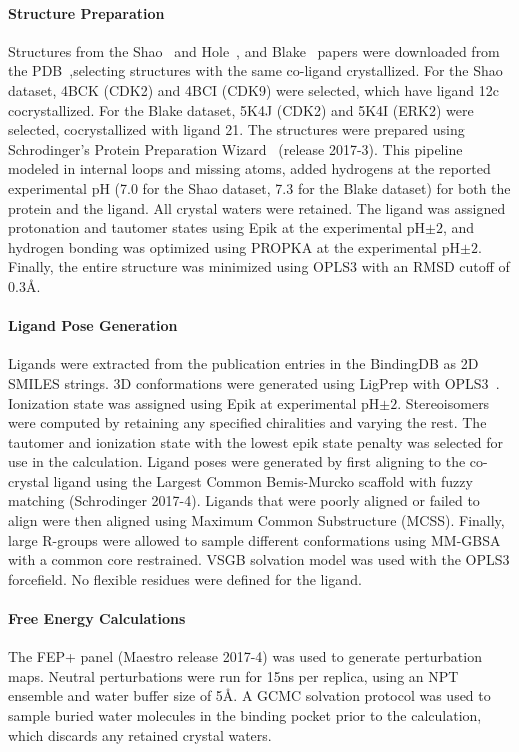 \documentclass[9pt,lineno]{elife-modified} %
\begin{document}
\paragraph{Structure Preparation}
Structures from the Shao~\citep{Shao2013-oe} and Hole~\citep{Hole2013-sr}, and Blake~\citep{Blake2016-su} papers were downloaded from the PDB~\citep{Berman2002-hg},selecting structures with the same co-ligand crystallized. For the Shao dataset, 4BCK (CDK2) and 4BCI (CDK9) were selected, which have ligand 12c cocrystallized. For the Blake dataset, 5K4J (CDK2) and 5K4I (ERK2) were selected, cocrystallized with ligand 21. The structures were prepared using Schrodinger’s Protein Preparation Wizard~\citep{Sastry2013-ax} (release 2017-3). This pipeline modeled in internal loops and missing atoms, added hydrogens at the reported experimental pH (7.0 for the Shao dataset, 7.3 for the Blake dataset) for both the protein and the ligand. All crystal waters were retained. The ligand was assigned protonation and tautomer states using Epik at the experimental pH$\pm2$, and hydrogen bonding was optimized using PROPKA at the experimental pH$\pm2$. Finally, the entire structure was minimized using OPLS3 with an RMSD cutoff of 0.3\AA.

\paragraph{Ligand Pose Generation}
Ligands were extracted from the publication entries in the BindingDB as  2D SMILES strings. 3D conformations were generated using LigPrep with OPLS3~\citep{Harder2016-zn}. Ionization state was assigned using Epik at experimental pH$\pm2$. Stereoisomers were computed by retaining any specified chiralities and varying the rest. The tautomer and ionization state with the lowest epik state penalty was selected for use in the calculation. Ligand poses were generated by first aligning to the co-crystal ligand using the Largest Common Bemis-Murcko scaffold with fuzzy matching (Schrodinger 2017-4). Ligands that were poorly aligned or failed to align were then aligned using Maximum Common Substructure (MCSS). Finally, large R-groups were allowed to sample different conformations using MM-GBSA with a common core restrained. VSGB solvation model was used with the OPLS3 forcefield. No flexible residues were defined for the ligand. 

\paragraph{Free Energy Calculations}
The FEP+ panel (Maestro release 2017-4) was used to generate perturbation maps. Neutral perturbations were run for 15ns per replica, using an NPT ensemble and water buffer size of 5\AA. A GCMC solvation protocol was used to sample buried water molecules in the binding pocket prior to the calculation, which discards any retained crystal waters. 
\end{document}
